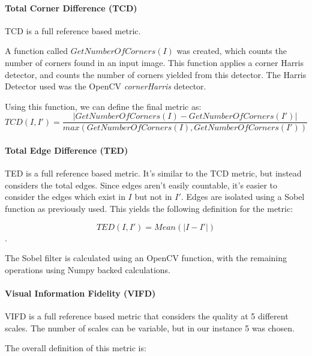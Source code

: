 \documentclass[10pt,a4paper]{article}
\begin{document}
            \paragraph{Total Corner Difference (TCD)}
                TCD is a full reference based metric. 
                
                A function called $GetNumberOfCorners(I)$ was created, which counts the number of corners found in an input image. This function applies a corner Harris detector,
                and counts the number of corners yielded from this detector. The Harris Detector used was the OpenCV \emph{cornerHarris} detector. 


                Using this function, we can define the final metric as: 
                $$TCD(I, I') = \frac{|GetNumberOfCorners(I) - GetNumberOfCorners(I')|}{max({GetNumberOfCorners(I), GetNumberOfCorners(I')})}$$

            \paragraph{Total Edge Difference (TED)}
                TED is a full reference based metric. It's similar to the TCD metric, but instead considers the total edges.
                Since edges aren't easily countable, it's easier to consider the edges which exist in $I$ but not in $I'$. 
                Edges are isolated using a Sobel function as previously used. This yields the following definition for the metric:

                $$TED(I, I') = Mean(|I - I'|)$$.

                The Sobel filter is calculated using an OpenCV function, with the remaining operations using Numpy backed calculations.

            \paragraph{Visual Information Fidelity (VIFD)}
                VIFD is a full reference based metric that considers the quality at 5 different scales. The number of scales can be variable, but in our instance 5 was chosen.

                The overall definition of this metric is:
\end{document}
